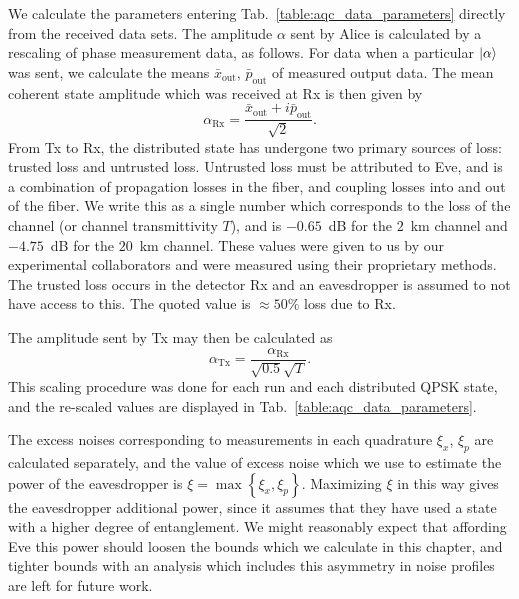 We calculate the parameters entering Tab.~\ref{table:aqc_data_parameters} directly from the received data sets. The amplitude $\alpha$ sent by Alice is calculated by a rescaling of phase measurement data, as follows. For data when a particular $\ket{\alpha}$ was sent, we calculate the means $\bar{x}_{\text{out}}$, $\bar{p}_{\text{out}}$ of measured output data. The mean coherent state amplitude which was received at Rx is then given by 
\begin{equation}
\alpha_{\text{Rx}} = \frac{\bar{x}_{\text{out}} + i \bar{p}_{\text{out}}}{\sqrt{2}}.
\end{equation}
From Tx to Rx, the distributed state has undergone two primary sources of loss: trusted loss and untrusted loss. Untrusted loss must be attributed to Eve, and is a combination of propagation losses in the fiber, and coupling losses into and out of the fiber.  We write this as a single number which corresponds to the loss of the channel (or channel transmittivity $T$), and is $-0.65$~dB for the $2$~km channel and $-4.75$~dB for the $20$~km channel. These values were given to us by our experimental collaborators and were measured using their proprietary methods. The trusted loss occurs in the detector Rx and an eavesdropper is assumed to not have access to this. The quoted value is $\approx 50\%$ loss due to Rx.

The amplitude sent by Tx may then be calculated as
\begin{equation}
\alpha_{\text{Tx}} = \frac{\alpha_{\text{Rx}}}{\sqrt{0.5} \sqrt{T}}.
\end{equation}
This scaling procedure was done for each run and each distributed QPSK state, and the re-scaled values are displayed in Tab.~\ref{table:aqc_data_parameters}.

The excess noises corresponding to measurements in each quadrature $\xi_x$, $\xi_p$ are calculated separately, and the value of excess noise which we use to estimate the power of the eavesdropper is $\xi = \max \left\{\xi_x, \xi_p\right\}$. Maximizing $\xi$ in this way gives the eavesdropper additional power, since it assumes that they have used a state with a higher degree of entanglement. We might reasonably expect that affording Eve this power should loosen the bounds which we calculate in this chapter, and tighter bounds with an analysis which includes this asymmetry in noise profiles are left for future work.

